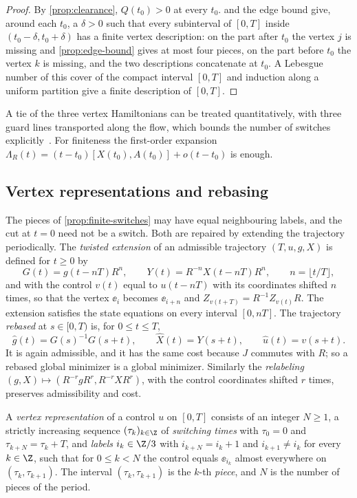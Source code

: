 \begin{proof}
By \cref{prop:clearance}, $Q(t_0)>0$ at every $t_0$.  and the edge bound
give, around each $t_0$, a $\delta>0$ such that every subinterval of $[0,T]$ inside
$(t_0-\delta,t_0+\delta)$ has a finite vertex description: on the part after $t_0$ the vertex $j$
is missing and \cref{prop:edge-bound} gives at most four pieces, on the part before $t_0$ the vertex
$k$ is missing, and the two descriptions concatenate at $t_0$. A Lebesgue number of this cover of
the compact interval $[0,T]$ and induction along a uniform partition give a finite description of
$[0,T]$.
\end{proof}

A tie of the three vertex Hamiltonians can be treated quantitatively, with three guard lines
transported along the flow, which bounds the number of switches explicitly~\cite{Notes}. For
finiteness the first-order expansion $\Lambda_R(t)=(t-t_0)[X(t_0),A(t_0)]+o(t-t_0)$ is enough.

\subsection{Vertex representations and rebasing}\label{red:rebase}

The pieces of \cref{prop:finite-switches} may have equal neighbouring labels, and the cut at $t=0$
need not be a switch. Both are repaired by extending the trajectory periodically. The \emph{twisted
extension} of an admissible trajectory $(T,u,g,X)$ is defined for $t\ge0$ by
\[
G(t)=g(t-nT)R^n,\qquad Y(t)=R^{-n}X(t-nT)R^n,\qquad n=\lfloor t/T\rfloor,
\]
and with the control $v(t)$ equal to $u(t-nT)$ with its coordinates shifted $n$ times, so that
the vertex $\ee_i$ becomes $\ee_{i+n}$ and $Z_{v(t+T)}=R^{-1}Z_{v(t)}R$. The extension satisfies the state equations
on every interval $[0,nT]$. The trajectory \emph{rebased} at $s\in[0,T)$ is, for $0\le t\le T$,
\[
\hat g(t)=G(s)^{-1}G(s+t),\qquad \hat X(t)=Y(s+t),\qquad \hat u(t)=v(s+t).
\]
It is again admissible, and it has the same cost because $J$ commutes with $R$; so a rebased global
minimizer is a global minimizer. Similarly the
\emph{relabeling} $(g,X)\mapsto(R^{-r}gR^r,R^{-r}XR^r)$, with the control coordinates shifted $r$
times, preserves admissibility and cost.

\begin{definition}\label{def:vertex-representation}
A \emph{vertex representation} of a control $u$ on $[0,T]$ consists of an integer $N\ge1$, a
strictly increasing sequence $(\tau_k)_{k\in\Z}$ of \emph{switching times} with $\tau_0=0$ and
$\tau_{k+N}=\tau_k+T$, and \emph{labels} $i_k\in\Z/3$ with $i_{k+N}=i_k+1$ and $i_{k+1}\ne i_k$ for
every $k\in\Z$, such that for $0\le k<N$ the control equals $\ee_{i_k}$ almost everywhere on
$(\tau_k,\tau_{k+1})$. The interval $(\tau_k,\tau_{k+1})$ is the
$k$-th \emph{piece}, and $N$ is the number of pieces of the period.
\end{definition}


